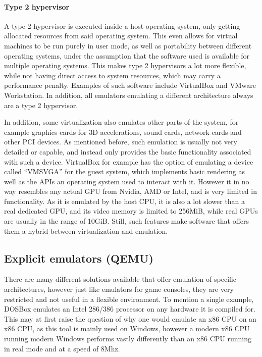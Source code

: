 \paragraph{Type 2 hypervisor} A type 2 hypervisor is executed inside a host operating system,
only getting allocated resources from said operating system.
This even allows for virtual machines to be run purely in user mode,
as well as portability between different operating systems,
under the assumption that the software used is available for multiple operating systems.
This makes type 2 hypervisors a lot more flexible,
while not having direct access to system resources,
which may carry a performance penalty.
Examples of such software include VirtualBox and VMware Workstation\cite{hypervisor}.
In addition, all emulators emulating a different architecture always are a type 2 hypervisor.

In addition, some virtualization also emulates other parts of the system,
for example graphics cards for 3D accelerations, sound cards, network cards
and other PCI devices.
As mentioned before, such emulation is usually not very detailed or capable,
and instead only provides the basic functionality associated with such a device.
VirtualBox for example has the option of emulating a device called \enquote{VMSVGA}
for the guest system, which implements basic rendering as well as the APIs
an operating system used to interact with it.
However it in no way resembles any actual GPU from Nvidia, AMD or Intel,
and is very limited in functionality.
As it is emulated by the host CPU, it is also a lot slower than a real dedicated GPU,
and its video memory is limited to 256MiB, while real GPUs are usually in the range of 10GiB.
Still, such features make software that offers them a hybrid between virtualization and emulation.

\subsection{Explicit emulators (QEMU)}
There are many different solutions available that offer emulation of specific architectures,
however just like emulators for game consoles, they are very restricted and not useful in a flexible environment.
To mention a single example, DOSBox emulates an Intel 286/386 processor on any hardware it is compiled for.
This may at first raise the question of why one would emulate an x86 CPU on an x86 CPU,
as this tool is mainly used on Windows,
however a modern x86 CPU running modern Windows performs vastly differently than
an x86 CPU running in real mode and at a speed of 8Mhz.

